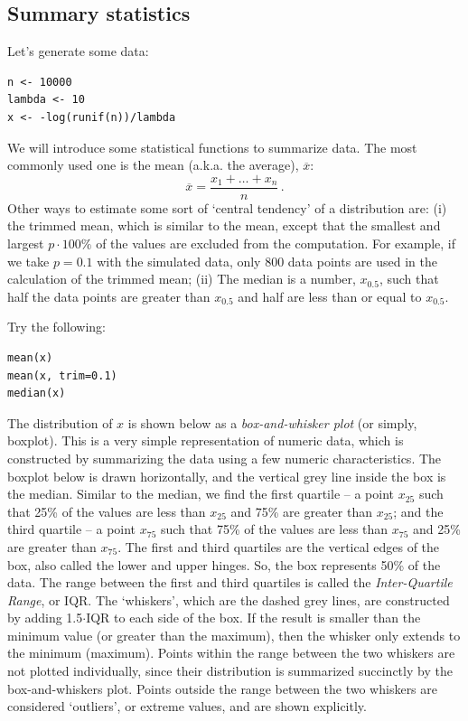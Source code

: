 \documentclass[11pt]{article}
\theoremstyle{definition}
\begin{document}
\subsection{Summary statistics}
Let's generate some data:
\begin{verbatim}
n <- 10000
lambda <- 10
x <- -log(runif(n))/lambda
\end{verbatim}
We will introduce some statistical functions to summarize data. The most commonly used one is the mean (a.k.a. the average), $\overline{x}$:
$$\overline{x}=\frac{x_1+\ldots+x_n}{n}\,.$$
Other ways to estimate some sort of `central tendency' of a distribution are:
 (i) the trimmed mean, which is similar to the mean, except that the smallest and largest $p\cdot 100\%$  of the values are excluded from the computation. For example, if we take $p=0.1$ with the simulated data, only 800 data points are used in the calculation of the trimmed mean; (ii) The median is a number, $x_{0.5}$, such that half the data points are greater than $x_{0.5}$ and half are less than or equal to $x_{0.5}$. 

Try the following:
\begin{verbatim}
mean(x)
mean(x, trim=0.1)
median(x)
\end{verbatim}

The distribution of $x$ is shown below as a \textit{box-and-whisker plot} (or simply, boxplot). This is a very simple representation of numeric data, which is constructed by summarizing the data using a few numeric characteristics. The boxplot below is drawn horizontally, and the vertical grey line inside the box is the median. Similar to the median, we find the first quartile -- a point $x_{25}$ such that 25\% of the values are less than $x_{25}$ and 75\% are greater than $x_{25}$; and the third quartile -- a point $x_{75}$ such that 75\% of the values are less than $x_{75}$ and 25\% are greater than $x_{75}$. The first and third quartiles are the vertical edges of the box, also called the lower and upper hinges. So, the box represents 50\% of the data. The range between the first and third quartiles is called the \textit{Inter-Quartile Range}, or IQR.
The `whiskers', which are the dashed grey lines, are constructed by adding 1.5$\cdot$IQR to each side of the box. If the result is smaller than the minimum value (or greater than the maximum), then the whisker only extends to the minimum (maximum). Points within the range between the two whiskers are not plotted individually, since their distribution is summarized succinctly by the box-and-whiskers plot. Points outside the range between the two whiskers are considered `outliers', or extreme values, and are shown explicitly. 
\end{document}
